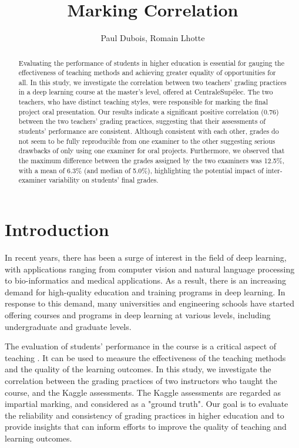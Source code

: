 \documentclass[a4paper]{article}
\title{Marking Correlation}
\author{Paul Dubois, Romain Lhotte}
\begin{document}
	\maketitle
	\begin{abstract}
		Evaluating the performance of students in higher education is essential for gauging the effectiveness of teaching methods and achieving greater equality of opportunities for all.
		In this study, we investigate the correlation between two teachers' grading practices in a deep learning course at the master's level, offered at CentraleSupélec.
		The two teachers, who have distinct teaching styles, were responsible for marking the final project oral presentation.
		Our results indicate a significant positive correlation (0.76) between the two teachers' grading practices, suggesting that their assessments of students' performance are consistent.
		Although consistent with each other, grades do not seem to be fully reproducible from one examiner to the other suggesting serious drawbacks of only using one examiner for oral projects.
		Furthermore, we observed that the maximum difference between the grades assigned by the two examiners was 12.5\%, with a mean of 6.3\% (and median of 5.0\%), highlighting the potential impact of inter-examiner variability on students' final grades.
	\end{abstract}
	
	\section{Introduction}
	In recent years, there has been a surge of interest in the field of deep learning, with applications ranging from computer vision\cite{Voulodimos2018}\cite{CHAI2021} and natural language processing\cite{sun2021} to bio-informatics\cite{MIN2016}\cite{Zhang2020} and medical applications\cite{JAMIA2019}.
	As a result, there is an increasing demand for high-quality education and training programs in deep learning\cite{ResearchAndMarkets2023}.
	In response to this demand, many universities and engineering schools have started offering courses and programs in deep learning at various levels, including undergraduate and graduate levels.
	
	The evaluation of students' performance in the course is a critical aspect of teaching \cite{Karaman2011}\cite{Efu2019}.
	It can be used to measure the effectiveness of the teaching methods and the quality of the learning outcomes.
	In this study, we investigate the correlation between the grading practices of two instructors who taught the course, and the Kaggle assessments.
	The Kaggle assessments are regarded as impartial marking, and considered as a "ground truth".
	Our goal is to evaluate the reliability and consistency of grading practices in higher education and to provide insights that can inform efforts to improve the quality of teaching and learning outcomes.
	
\end{document}
